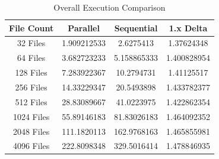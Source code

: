 \documentclass[report]{IEEEtran}
\begin{document}
\begin{table}[!t]
\renewcommand{\arraystretch}{1.3}
\caption{Overall Execution Comparison \cite{BAN}}
\label{ExecutionComparison}
\centering

\begin{tabular}{|c||c||c||c|}
\hline
File Count & Parallel & Sequential & 1.x Delta\\
\hline
32 Files & 1.909212533 & 2.6275413 & 1.37624348\\
\hline
64 Files & 3.682723233 & 5.158865333 & 1.400828954\\
\hline
128 Files & 7.283922367 & 10.2794731 & 1.41125517\\
\hline
256 Files & 14.33229347 & 20.5493898 & 1.433782377\\
\hline
512 Files & 28.83089667 & 41.0223975 & 1.422862354\\
\hline
1024 Files & 55.89146183 & 81.83026183 & 1.464092352\\
\hline
2048 Files & 111.1820113 & 162.9768163 & 1.465855981\\
\hline
4096 Files & 222.8098348 & 329.5016414 & 1.478846935\\
\hline
\end{tabular}
\end{table}

\FloatBarrier
\end{document}
